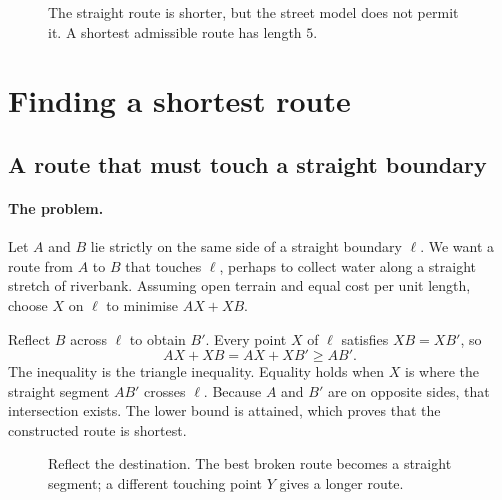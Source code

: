 \begin{figure}[htbp]\centering
{}
\caption{The straight route is shorter, but the street model does not permit it. A shortest admissible route has length $5$.}
\end{figure}

\section{Finding a shortest route}
\label{sec:geo-shortest}
\subsection{A route that must touch a straight boundary}
\paragraph{The problem.}
Let $A$ and $B$ lie strictly on the same side of a straight boundary $\ell$.
We want a route from $A$ to $B$ that touches $\ell$, perhaps to collect
water along a straight stretch of riverbank. Assuming open terrain and
equal cost per unit length, choose $X$ on $\ell$ to minimise $AX+XB$.

Reflect $B$ across $\ell$ to obtain $B'$. Every point $X$ of $\ell$
satisfies $XB=XB'$, so
\[
AX+XB=AX+XB'\geq AB'.
\]
The inequality is the triangle inequality. Equality holds when $X$ is
where the straight segment $AB'$ crosses $\ell$. Because $A$ and $B'$
are on opposite sides, that intersection exists. The lower bound is
attained, which proves that the constructed route is shortest.

\begin{figure}[htbp]\centering
{}
\caption{Reflect the destination. The best broken route becomes a straight segment; a different touching point $Y$ gives a longer route.}
\end{figure}

